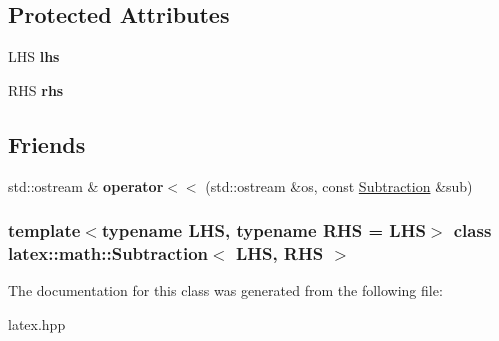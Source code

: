 \subsection*{\-Protected \-Attributes}
\begin{DoxyCompactItemize}
\item 
\hypertarget{classlatex_1_1math_1_1Subtraction_a67b20ecf5ef3502267c3e6ff97913e06}{\-L\-H\-S {\bfseries lhs}}\label{classlatex_1_1math_1_1Subtraction_a67b20ecf5ef3502267c3e6ff97913e06}

\item 
\hypertarget{classlatex_1_1math_1_1Subtraction_a26db1c6713c7a71f94514f2650d486cc}{\-R\-H\-S {\bfseries rhs}}\label{classlatex_1_1math_1_1Subtraction_a26db1c6713c7a71f94514f2650d486cc}

\end{DoxyCompactItemize}
\subsection*{\-Friends}
\begin{DoxyCompactItemize}
\item 
\hypertarget{classlatex_1_1math_1_1Subtraction_ae77c371395f130ab14f3c769df6494ee}{std\-::ostream \& {\bfseries operator$<$$<$} (std\-::ostream \&os, const \hyperlink{classlatex_1_1math_1_1Subtraction}{\-Subtraction} \&sub)}\label{classlatex_1_1math_1_1Subtraction_ae77c371395f130ab14f3c769df6494ee}

\end{DoxyCompactItemize}
\subsubsection*{template$<$typename \-L\-H\-S, typename \-R\-H\-S = \-L\-H\-S$>$ class latex\-::math\-::\-Subtraction$<$ L\-H\-S, R\-H\-S $>$}



\-The documentation for this class was generated from the following file\-:\begin{DoxyCompactItemize}
\item 
latex.\-hpp\end{DoxyCompactItemize}
